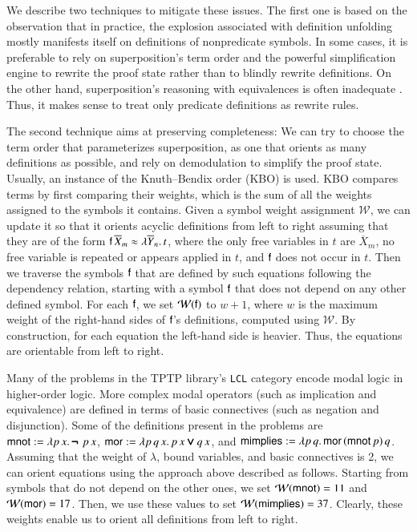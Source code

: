 We describe two techniques to mitigate these issues. The first one is based on the observation that in practice,
the explosion associated with definition unfolding mostly
manifests itself on definitions of nonpredicate symbols. In some cases, it is
preferable to rely on superposition's term order and the powerful simplification
engine to rewrite the proof state rather than to blindly rewrite definitions. On
the other hand, superposition's reasoning with equivalences is often inadequate
\cite{bbtv-21-full-ho-sup, gs-05-boolsup}. Thus, it makes sense to treat only
predicate definitions as rewrite rules.

The second technique aims at preserving completeness: We can try to choose the term order that
parameterizes superposition, as one that orients as many definitions as possible, and rely on
demodulation to simplify the proof state. Usually, an instance of the Knuth--Bendix order (KBO)
\cite{db-1970-kbo} is used. KBO compares terms by first comparing their weights,
which is the sum of all the weights assigned to the symbols it contains. Given a
symbol weight assignment $\mathcal{W}$, we can update it so that it orients
acyclic definitions from left to right assuming that they are of the form $
\mathsf{f} \, \overline{X}_m \approx \lambda \overline{Y}_n. \, t$, where the only free
variables in $t$ are $\overline{X}_m$, no free variable is repeated or appears
applied in $t$, and $\mathsf{f}$ does not occur in $t$. Then we traverse the
symbols $\mathsf{f}$ that are defined by such equations following the dependency
relation, starting with a symbol $\mathsf{f}$ that does not depend on any other
defined symbol. For each $\mathsf{f}$, we set $\mathcal{W}(\mathsf{f})$ to $w + 1$,
where $w$ is the maximum weight of the right-hand sides of $\mathsf{f}$'s
definitions, computed using $\mathcal{W}$. By construction, for each equation
the left-hand side is heavier. Thus, the equations are orientable from left to
right.



\begin{exa} 
  Many of the problems in the TPTP library's \verb|LCL| category encode modal logic
  in higher-order logic. More complex modal operators (such as
  implication and equivalence) are defined in terms of basic connectives (such as negation
  and disjunction). Some of the definitions present in the problems are
  $\mathsf{mnot} := \lambda p\, x. \, \pmb{\neg\,} \, p \, x$, $\mathsf{mor} := \lambda p\, q\, x.
  \, p \, x \pmb{\lor} q \, x$,  and $\mathsf{mimplies} := \lambda p\, q. \allowbreak\, \mathsf{mor} \,
  (\mathsf{mnot} \, p) \, q$. Assuming that the weight of $\lambda$, bound
  variables, and basic connectives is 2, we can orient equations using
  the approach above described as follows. Starting from symbols that do not
  depend on the other ones, we set $\mathcal{W}(\mathsf{mnot}) = 11$ and
  $\mathcal{W}(\mathsf{mor}) = 17$. Then, we use these values to set
  $\mathcal{W}(\mathsf{mimplies}) = 37$. Clearly, these weights
  enable us to orient all definitions from left to right.
\end{exa}


